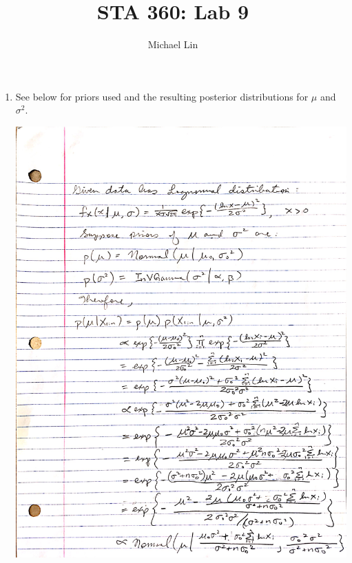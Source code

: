 \documentclass{article}
\title{STA 360: Lab 9}
\author{Michael Lin}
\begin{document}
\maketitle

\begin{enumerate}
\item See below for priors used and the resulting posterior distributions for $\mu$ and $\sigma^2$.

\includegraphics[scale = 0.2]{page1.jpg}\\

\end{enumerate}
\end{document}
